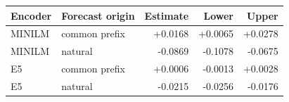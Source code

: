 \begin{tabular}{llrrr}
Encoder & Forecast origin & Estimate & Lower & Upper \\
\hline\hline
MINILM & common prefix & +0.0168 & +0.0065 & +0.0278 \\
MINILM & natural & -0.0869 & -0.1078 & -0.0675 \\
E5 & common prefix & +0.0006 & -0.0013 & +0.0028 \\
E5 & natural & -0.0215 & -0.0256 & -0.0176 \\
\end{tabular}
